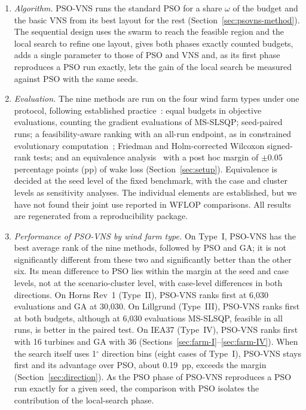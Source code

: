 \begin{enumerate}
\item \emph{Algorithm.} PSO-VNS runs the standard PSO for a share $\omega$ of the budget and the basic VNS from its best layout for the rest (Section~\ref{sec:psovns-method}). The sequential design uses the swarm to reach the feasible region and the local search to refine one layout, gives both phases exactly counted budgets, adds a single parameter to those of PSO and VNS and, as its first phase reproduces a PSO run exactly, lets the gain of the local search be measured against PSO with the same seeds.
\item \emph{Evaluation.} The nine methods are run on the four wind farm types under one protocol, following established practice~\cite{Derrac2011,BartzBeielstein2020,LaTorre2021}: equal budgets in objective evaluations, counting the gradient evaluations of MS-SLSQP; seed-paired runs; a feasibility-aware ranking with an all-run endpoint, as in constrained evolutionary computation~\cite{Deb2000,Wu2017}; Friedman and Holm-corrected Wilcoxon signed-rank tests; and an equivalence analysis~\cite{Lakens2017,Benavoli2017} with a post hoc margin of $\pm0.05$ percentage points (pp) of wake loss (Section~\ref{sec:setup}). Equivalence is decided at the seed level of the fixed benchmark, with the case and cluster levels as sensitivity analyses. The individual elements are established, but we have not found their joint use reported in WFLOP comparisons. All results are regenerated from a reproducibility package.
\item \emph{Performance of PSO-VNS by wind farm type.} On Type~I, PSO-VNS has the best average rank of the nine methods, followed by PSO and GA; it is not significantly different from these two and significantly better than the other six. Its mean difference to PSO lies within the margin at the seed and case levels, not at the scenario-cluster level, with case-level differences in both directions. On Horns Rev~1 (Type~II), PSO-VNS ranks first at 6,030 evaluations and GA at 30,030. On Lillgrund (Type~III), PSO-VNS ranks first at both budgets, although at 6,030 evaluations MS-SLSQP, feasible in all runs, is better in the paired test. On IEA37 (Type~IV), PSO-VNS ranks first with 16 turbines and GA with 36 (Sections~\ref{sec:farm-I}--\ref{sec:farm-IV}). When the search itself uses 1$^\circ$ direction bins (eight cases of Type~I), PSO-VNS stays first and its advantage over PSO, about 0.19~pp, exceeds the margin (Section~\ref{sec:direction}). As the PSO phase of PSO-VNS reproduces a PSO run exactly for a given seed, the comparison with PSO isolates the contribution of the local-search phase.

\end{enumerate}
